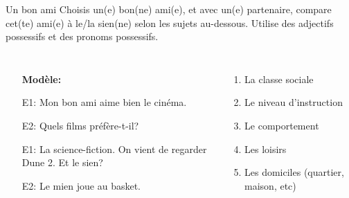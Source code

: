 \begin{frame}{Un bon ami}
  Choisis un(e) bon(ne) ami(e), et avec un(e) partenaire, compare cet(te) ami(e) à le/la sien(ne) selon les sujets au-dessous.
  Utilise des adjectifs possessifs et des pronoms possessifs.
  \begin{columns}
      \begin{itemize}
        \item[] \textbf{Modèle:}
        \item[E1:] Mon bon ami aime bien le cinéma.
        \item[E2:] Quels films préfère-t-il?
        \item[E1:] La science-fiction. On vient de regarder Dune 2. Et le sien?
        \item[E2:] Le mien joue au basket.
      \end{itemize}
      \begin{enumerate}
        \item La classe sociale
        \item Le niveau d'instruction
        \item Le comportement
        \item Les loisirs
        \item Les domiciles (quartier, maison, etc)
      \end{enumerate}
  \end{columns}
\end{frame}